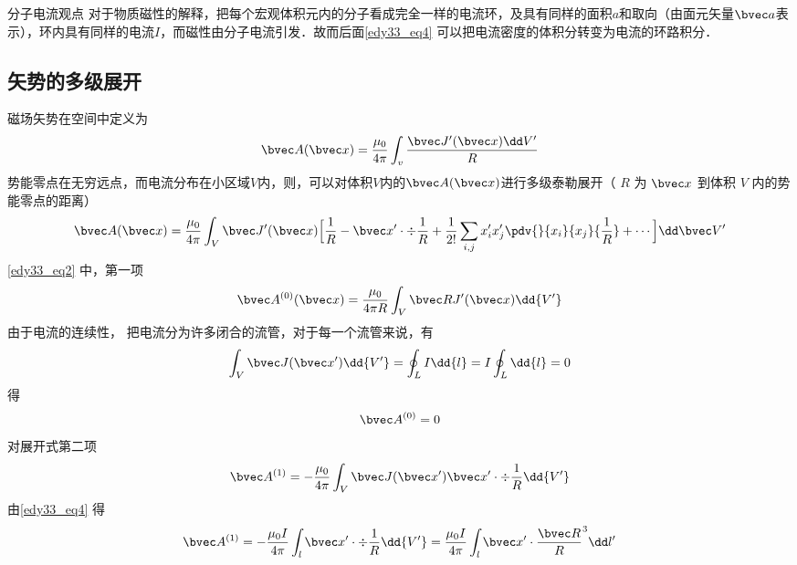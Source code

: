 
\begin{lemma}{分子电流观点}
对于物质磁性的解释，把每个宏观体积元内的分子看成完全一样的电流环，及具有同样的面积$a$和取向（由面元矢量$\bvec a$表示），环内具有同样的电流$I$，而磁性由分子电流引发．故而后面\autoref{edy33_eq4} 可以把电流密度的体积分转变为电流的环路积分．
\end{lemma}
\subsection{矢势的多级展开}
磁场矢势在空间中定义为 %
\begin{equation}
\bvec A(\bvec x)=\dfrac {\mu_0}{4\pi} \int_v \dfrac{ \bvec J^{\prime}(\bvec x)\dd V^{\prime}}{R}\label{edy33_eq1}
\end{equation}
势能零点在无穷远点，而电流分布在小区域$V$内，则，可以对体积$V$内的$\bvec A(\bvec x)$进行多级泰勒展开（ $R$ 为 $\bvec x$ 到体积 $V$ 内的势能零点的距离）
\begin{equation}
\bvec A(\bvec x)=\dfrac {\mu_0}{4\pi}\int_V \bvec J^{\prime}(\bvec x)\Big[\dfrac{1}{R}-\bvec x^{\prime} \cdot\div \dfrac{1}{R}+\dfrac{1}{2!}\sum_{i,j}x_i^{\prime}x_j^{\prime}\pdv{}{x_i}{x_j}{\dfrac 1 R}+\cdots\Big]\dd \bvec V^{\prime}\label{edy33_eq2}
\end{equation}
\autoref{edy33_eq2} 中，第一项
\begin{equation}
\bvec A^{(0)}(\bvec x)=\dfrac {\mu_0}{4\pi R}\int_V \bvec RJ^{\prime}(\bvec x)\dd{ V^{\prime}}\label{edy33_eq3}
\end{equation}
由于电流的连续性，%
把电流分为许多闭合的流管，对于每一个流管来说，有
\begin{equation}
\int_V \bvec J(\bvec x^{\prime}) \dd{V^{\prime}}=\oint_L I\dd{l}=I\oint_L \dd{l}=0\label{edy33_eq4}
\end{equation}
得\begin{equation}
\bvec A^{(0)}=0\label{edy33_eq5}
\end{equation}
对展开式第二项
\begin{equation}
\bvec A^{(1)}=-\dfrac{\mu_0 }{4\pi}\int_V \bvec J(\bvec x^{\prime})\bvec x^{\prime}\cdot\div\dfrac1 R\dd{V^{\prime}}\label{edy33_eq6}
\end{equation}
由\autoref{edy33_eq4} 得
\begin{equation}
\bvec A^{(1)}=-\dfrac{\mu_0 I }{4\pi}\int_l \bvec x^{\prime}\cdot\div\dfrac1 R\dd{V^{\prime}}=\dfrac{\mu_0 I }{4\pi}\int_l \bvec x^{\prime}\cdot\dfrac{\bvec R}R^3\dd l^{\prime}\label{edy33_eq7}
\end{equation}
